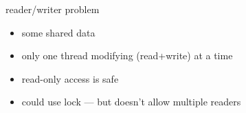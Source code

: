 \begin{frame}{reader/writer problem}
    \begin{itemize}
    \item some shared data 
    \item only one thread modifying (read+write) at a time
    \item read-only access  is safe
    \vspace{.5cm}
    \item<2-> could use lock --- but doesn't allow multiple readers
    \end{itemize}
\end{frame}
